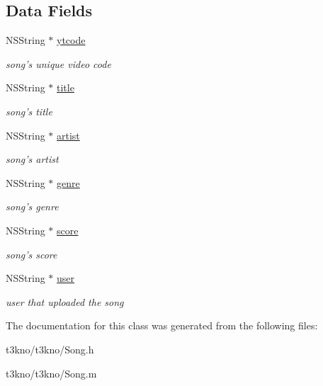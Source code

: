 \subsection*{Data Fields}
\begin{DoxyCompactItemize}
\item 
\hypertarget{interface_song_a637f23ec316ab21f34752347e0b9b2b3}{N\-S\-String $\ast$ \hyperlink{interface_song_a637f23ec316ab21f34752347e0b9b2b3}{ytcode}}\label{interface_song_a637f23ec316ab21f34752347e0b9b2b3}

\begin{DoxyCompactList}\small\item\em song's unique video code \end{DoxyCompactList}\item 
\hypertarget{interface_song_ad39b2fbc36bb32f1287f61db3d3477a1}{N\-S\-String $\ast$ \hyperlink{interface_song_ad39b2fbc36bb32f1287f61db3d3477a1}{title}}\label{interface_song_ad39b2fbc36bb32f1287f61db3d3477a1}

\begin{DoxyCompactList}\small\item\em song's title \end{DoxyCompactList}\item 
\hypertarget{interface_song_a5216e2b124d6c4f7212c6453c5d4275c}{N\-S\-String $\ast$ \hyperlink{interface_song_a5216e2b124d6c4f7212c6453c5d4275c}{artist}}\label{interface_song_a5216e2b124d6c4f7212c6453c5d4275c}

\begin{DoxyCompactList}\small\item\em song's artist \end{DoxyCompactList}\item 
\hypertarget{interface_song_a7c1b0908f1c1baf659631685277af454}{N\-S\-String $\ast$ \hyperlink{interface_song_a7c1b0908f1c1baf659631685277af454}{genre}}\label{interface_song_a7c1b0908f1c1baf659631685277af454}

\begin{DoxyCompactList}\small\item\em song's genre \end{DoxyCompactList}\item 
\hypertarget{interface_song_a5f98c15a134637438ef145ef3a6e8a62}{N\-S\-String $\ast$ \hyperlink{interface_song_a5f98c15a134637438ef145ef3a6e8a62}{score}}\label{interface_song_a5f98c15a134637438ef145ef3a6e8a62}

\begin{DoxyCompactList}\small\item\em song's score \end{DoxyCompactList}\item 
\hypertarget{interface_song_a7976ff65e4b8771bfb5f1b8b3a4b791e}{N\-S\-String $\ast$ \hyperlink{interface_song_a7976ff65e4b8771bfb5f1b8b3a4b791e}{user}}\label{interface_song_a7976ff65e4b8771bfb5f1b8b3a4b791e}

\begin{DoxyCompactList}\small\item\em user that uploaded the song \end{DoxyCompactList}\end{DoxyCompactItemize}


The documentation for this class was generated from the following files\-:\begin{DoxyCompactItemize}
\item 
t3kno/t3kno/Song.\-h\item 
t3kno/t3kno/Song.\-m\end{DoxyCompactItemize}
